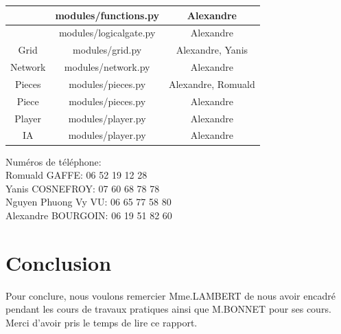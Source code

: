 \documentclass[a4paper]{report}
\begin{document}
\begin{center}
\begin{tabular}{|c|c|c|}
&	      					modules/functions.py&      	Alexandre\\\hline
&      						modules/logicalgate.py&     Alexandre\\\hline
Grid&      					modules/grid.py&      		Alexandre, Yanis\\\hline
Network&      				modules/network.py&      	Alexandre\\\hline
Pieces&      				modules/pieces.py&      	Alexandre, Romuald\\\hline
Piece&      				modules/pieces.py&      	Alexandre\\\hline
Player&      				modules/player.py&      	Alexandre\\\hline
IA&      					modules/player.py&      	Alexandre\\\hline
\end{tabular}\end{center}

Numéros de téléphone: \\
Romuald GAFFE: 06 52 19 12 28\\
Yanis COSNEFROY: 07 60 68 78 78\\
Nguyen Phuong Vy VU: 06 65 77 58 80\\
Alexandre BOURGOIN: 06 19 51 82 60\


\part{Conclusion}
Pour conclure, nous voulons remercier Mme.LAMBERT de nous avoir encadré pendant les cours de travaux pratiques ainsi que M.BONNET pour ses cours. Merci d'avoir pris le temps de lire ce rapport. \\
\end{document}
